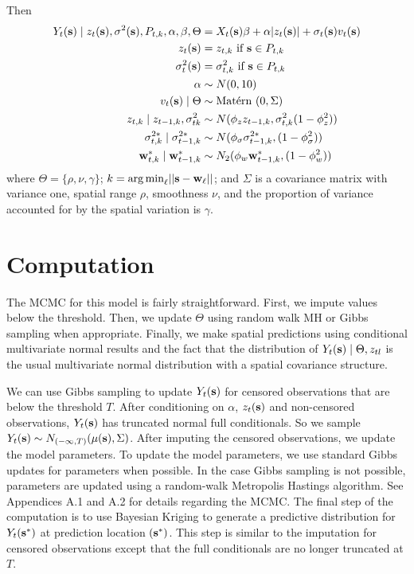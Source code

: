 \documentclass[11pt]{article}
\begin{document}
Then
\begin{align}
   Y_t(\mbox{\bf s}) \mid z_{t}(\mbox{\bf s}), \sigma^2(\mbox{\bf s}), P_{t,k}, \alpha, \beta, \Theta &= X_t(\mbox{\bf s}) \beta + \alpha |z_t(\mbox{\bf s})| + \sigma_t(\mbox{\bf s}) v_t(\mbox{\bf s}) \label{eq:hier}\\
   z_t(\mbox{\bf s}) &= z_{t,k} \text{ if } \mbox{\bf s} \in P_{t,k}\\
   \sigma^2_{t}(\mbox{\bf s}) &= \sigma^2_{t,k} \text{ if } \mbox{\bf s} \in P_{t,k}\\
   \alpha &\sim N(0, 10)\\
   v_t(\mbox{\bf s}) \mid \Theta &\sim \mbox{Mat$\acute{\mbox{e}}$rn }(0, \Sigma)\\
   z_{t,k} \mid z_{t-1, k}, \sigma^2_{tk} &\sim N(\phi_z z_{t-1, k}, \sigma^2_{t,k} (1 - \phi_z^2))\\
   \sigma^{2*}_{t,k} \mid \sigma^{2*}_{t-1, k} &\sim N(\phi_\sigma \sigma^{2*}_{t-1, k}, (1 - \phi_\sigma^2))\\
   \mbox{\bf w}^*_{t,k} \mid \mbox{\bf w}^*_{t-1, k} &\sim N_2(\phi_w \mbox{\bf w}^*_{t-1, k}, (1 - \phi_w^2))
\end{align}
where $\Theta = \{\rho, \nu, \gamma\}$; \mbox{$k = {\mathop{\rm arg\, min}}_\ell ||\mbox{\bf s} - \mbox{\bf w}_\ell ||$}; and $\Sigma$ is a \Matern covariance matrix with variance one, spatial range $\rho$, smoothness $\nu$, and the proportion of variance accounted for by the spatial variation is $\gamma$.

\section{Computation}\label{s:comp}
The MCMC for this model is fairly straightforward.
First, we impute values below the threshold.
Then, we update $\Theta$ using random walk MH or Gibbs sampling when appropriate.
Finally, we make spatial predictions using conditional multivariate normal results and the fact that the distribution of $Y_t(\mbox{\bf s}) \mid \Theta, z_{tl}$ is the usual multivariate normal distribution with a \Matern spatial covariance structure.

We can use Gibbs sampling to update $Y_t(\mbox{\bf s})$ for censored observations that are below the threshold $T$.
After conditioning on $\alpha$, $z_t(\mbox{\bf s})$ and non-censored observations, $Y_t(\mbox{\bf s})$ has truncated normal full conditionals.
So we sample $Y_t(\mbox{\bf s}) \sim N_{(-\infty, T)}(\mu(\mbox{\bf s}), \Sigma)$.
After imputing the censored observations, we update the model parameters.
To update the model parameters, we use standard Gibbs updates for parameters when possible.
In the case Gibbs sampling is not possible, parameters are updated using a random-walk Metropolis Hastings algorithm.
See Appendices A.1 and A.2 for details regarding the MCMC.
The final step of the computation is to use Bayesian Kriging to generate a predictive distribution for $Y_t(\mbox{\bf s}^*)$ at prediction location $(\mbox{\bf s}^*)$.
This step is similar to the imputation for censored observations except that the full conditionals are no longer truncated at $T$.
\end{document}
